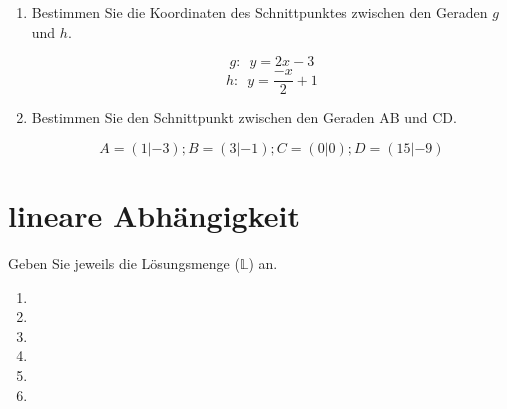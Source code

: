 \begin{enumerate}[label=\alph*)]
$$g: \,\,\,  y= -5x + 3$$


\item Bestimmen Sie die Koordinaten des Schnittpunktes zwischen den
Geraden $g$ und $h$.

$$g: \,\,\,  y= 2x - 3$$
$$h: \,\,\,  y= \frac{-x}2 +1$$

\item Bestimmen Sie den Schnittpunkt zwischen den Geraden AB und CD.


$$A=(1|-3); B=(3|-1); C=(0|0); D=(15|-9)$$


\end{enumerate}
\newpage

\section{lineare Abhängigkeit}
Geben Sie jeweils die Lösungsmenge ($\mathbb{L}$) an.


\begin{enumerate}[label=\alph*)]
\item
{}



\item






\item
{}




\item
{}



\item




\item
{}



\end{enumerate}

